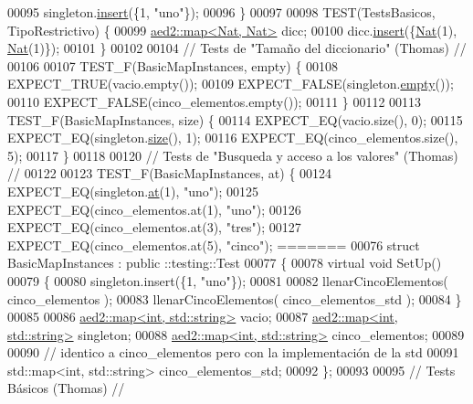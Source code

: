 \begin{DoxyCode}
00095     singleton.\hyperlink{classaed2_1_1map_a60aacba06b1579630b3c8e996cf248c8_a60aacba06b1579630b3c8e996cf248c8}{insert}(\{1, \textcolor{stringliteral}{"uno"}\});
00096 \}
00097 
00098 TEST(TestsBasicos, TipoRestrictivo) \{
00099     \hyperlink{classaed2_1_1map}{aed2::map<Nat, Nat>} dicc;
00100     dicc.\hyperlink{classaed2_1_1map_a60aacba06b1579630b3c8e996cf248c8_a60aacba06b1579630b3c8e996cf248c8}{insert}(\{\hyperlink{classNat}{Nat}(1), \hyperlink{classNat}{Nat}(1)\});
00101 \}
00102 
00104 \textcolor{comment}{// Tests de "Tamaño del diccionario" (Thomas) //}
00106 \textcolor{comment}{}
00107 TEST\_F(BasicMapInstances, empty) \{
00108     EXPECT\_TRUE(vacio.empty());
00109     EXPECT\_FALSE(singleton.\hyperlink{classaed2_1_1map_af5320ca0a7df4d16015441d5d055a7ee_af5320ca0a7df4d16015441d5d055a7ee}{empty}());
00110     EXPECT\_FALSE(cinco\_elementos.empty());
00111 \}
00112 
00113 TEST\_F(BasicMapInstances, size) \{
00114     EXPECT\_EQ(vacio.size(), 0);
00115     EXPECT\_EQ(singleton.\hyperlink{classaed2_1_1map_a89f2613f926ac13293eafe65889d6021_a89f2613f926ac13293eafe65889d6021}{size}(), 1);
00116     EXPECT\_EQ(cinco\_elementos.size(), 5);
00117 \}
00118 
00120 \textcolor{comment}{// Tests de "Busqueda y acceso a los valores" (Thomas) //}
00122 \textcolor{comment}{}
00123 TEST\_F(BasicMapInstances, at) \{
00124     EXPECT\_EQ(singleton.\hyperlink{classaed2_1_1map_a0b0a11f906da2926f9eb342fcee79fd7_a0b0a11f906da2926f9eb342fcee79fd7}{at}(1), \textcolor{stringliteral}{"uno"});
00125     EXPECT\_EQ(cinco\_elementos.at(1), \textcolor{stringliteral}{"uno"});
00126     EXPECT\_EQ(cinco\_elementos.at(3), \textcolor{stringliteral}{"tres"});
00127     EXPECT\_EQ(cinco\_elementos.at(5), \textcolor{stringliteral}{"cinco"});
=======
00076 \textcolor{keyword}{struct }BasicMapInstances : \textcolor{keyword}{public} ::testing::Test
00077 \{
00078     \textcolor{keyword}{virtual} \textcolor{keywordtype}{void} SetUp()
00079     \{
00080         singleton.insert(\{1, \textcolor{stringliteral}{"uno"}\});
00081 
00082         llenarCincoElementos( cinco\_elementos );
00083         llenarCincoElementos( cinco\_elementos\_std );
00084     \}
00085 
00086     \hyperlink{classaed2_1_1map}{aed2::map<int, std::string>} vacio;
00087     \hyperlink{classaed2_1_1map}{aed2::map<int, std::string>} singleton;
00088     \hyperlink{classaed2_1_1map}{aed2::map<int, std::string>} cinco\_elementos;
00089 
00090     \textcolor{comment}{// identico a cinco\_elementos pero con la implementación de la std}
00091     std::map<int, std::string> cinco\_elementos\_std;
00092 \};
00093 
00095 \textcolor{comment}{// Tests Básicos (Thomas)                                               //}

\end{DoxyCode}
